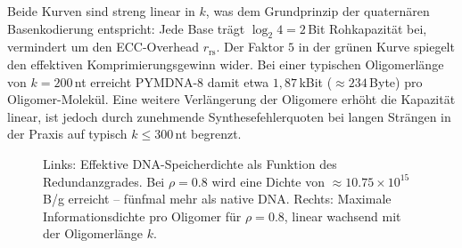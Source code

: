 ﻿\documentclass[a4paper,12pt]{article}
\theoremstyle{definition}
\begin{document}
Beide Kurven sind streng linear in $k$, was dem Grundprinzip der quaternären Basenkodierung entspricht: Jede Base trägt $\log_2 4 = 2$\,Bit Rohkapazität bei, vermindert um den ECC-Overhead $r_{\mathrm{rs}}$. Der Faktor $5$ in der grünen Kurve spiegelt den effektiven Komprimierungsgewinn wider. Bei einer typischen Oligomerlänge von $k = 200$\,nt erreicht PYMDNA-8 damit etwa $1{,}87$\,kBit ($\approx 234$\,Byte) pro Oligomer-Molekül. Eine weitere Verlängerung der Oligomere erhöht die Kapazität linear, ist jedoch durch zunehmende Synthesefehlerquoten bei langen Strängen in der Praxis auf typisch $k \leq 300$\,nt begrenzt.

\begin{figure}[H]
  \centering
  \hspace{0.02\textwidth}%
  \caption{Links: Effektive DNA-Speicherdichte als Funktion des Redundanzgrades.
    Bei $\rho = 0.8$ wird eine Dichte von $\approx 10.75 \times 10^{15}$\,B/g
    erreicht -- fünfmal mehr als native DNA.
    Rechts: Maximale Informationsdichte pro Oligomer für $\rho=0.8$,
    linear wachsend mit der Oligomerlänge $k$.}
  \label{fig:dichte_komprimierung}
\end{figure}
\end{document}
